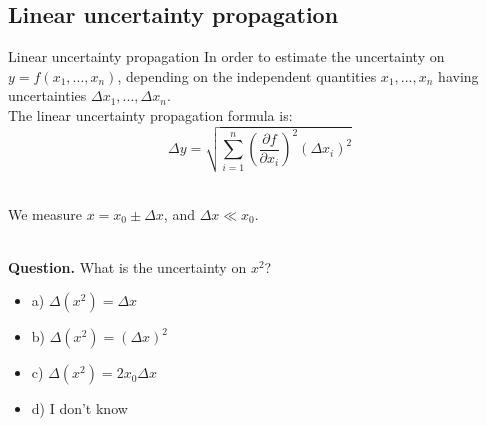 \documentclass[9pt, xcolor=dvipsnames]{beamer}
\begin{document}
\subsection{Linear uncertainty propagation}

\begin{frame}{Linear uncertainty propagation}
	\justify
	In order to estimate the uncertainty on $y = f(x_1, ..., x_n)$, depending on the independent quantities $x_1, ..., x_n$ having uncertainties $\Delta x_1, ..., \Delta x_n$.\\
	The linear uncertainty propagation formula is:
	\begin{equation}
		\Delta y = \sqrt{ \sum_{i=1}^{n} \left(\frac{\partial f}{\partial x_i}\right)^2 \left(\Delta x_i\right)^2 }
		\label{eq:uncertainty_propagation}
	\end{equation}
	
	~\\
	We measure $x = x_0  \pm \Delta x$, and $\Delta x \ll x_0$.
	
	~\\
	\textbf{Question.} What is the uncertainty on $x^2$?
	\begin{itemize}
		\item[] a) $\Delta \left(x^2\right) = \Delta x$
		\item[] b) $\Delta \left(x^2\right) = \left(\Delta x\right)^2$
		\item[] c) $\Delta \left(x^2\right) = 2 x_0 \Delta x$
		\item[] d) I don't know
	\end{itemize}

    ~\\
    ~\\
    ~\\
    \vspace{0.05cm}

\end{frame}


\end{document}

